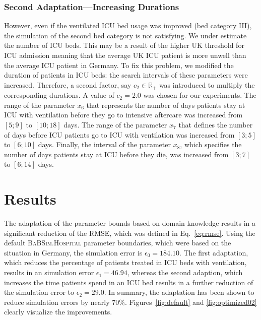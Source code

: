 \documentclass[conference]{IEEEtran}
\newcommand{\babsimhospital}{\textsc{BaBSim.Hospital}\xspace}
\begin{document}
\subsubsection{Second Adaptation---Increasing Durations}

However, even if the ventilated ICU bed usage was improved (bed category III), the simulation of the second bed category is not satisfying. We under estimate the number of ICU beds. This may be a result of the higher UK threshold for ICU admission meaning that the average UK ICU patient is more unwell than the average ICU patient in Germany. To fix this problem, we modified the duration of patients in ICU beds: the search intervals of these parameters were increased. Therefore, a second factor, say $c_2 \in \mathbb{R}_+$ was introduced to multiply the corresponding durations. A value of $c_2 = 2.0$ was chosen for our experiments.
The range of the parameter  $x_{6}$ that represents the number of days  patients stay at ICU with ventilation before they go to intensive aftercare was increased from $[5;9]$ to $[10;18]$ days. The range of the
parameter $x_{7}$  that defines the  number of days before ICU  patients go to ICU with ventilation was increased from $[3;5]$ to $[6;10]$ days. Finally, the interval of the parameter $x_{8}$, which specifies the number of days patients stay at ICU before they die, was increased from $[3;7]$ to $[6;14]$ days.


\section{Results}\label{sec:results}


The adaptation of the parameter bounds based on domain knowledge results in a significant reduction of the \gls{RMSE}, which was defined in  Eq.~\ref{eq:rmse}. 
Using the default \babsimhospital parameter boundaries, which were based on the situation in Germany, the simulation error is $\epsilon_0 = 184.10$.
The first adaptation, which reduces the percentage of patients treated in \gls{ICU} beds with ventilation, results in an simulation error $\epsilon_1 =  46.94$, whereas the second adaption, which increases the time patients spend in an \gls{ICU} bed results in a further reduction of the simulation error to $\epsilon_2 = 29.0$. In summary, the adaptation has been shown to reduce simulation errors by nearly 70\%.
Figures~\ref{fig:default} and \ref{fig:optimized02} clearly visualize the improvements.
\end{document}
